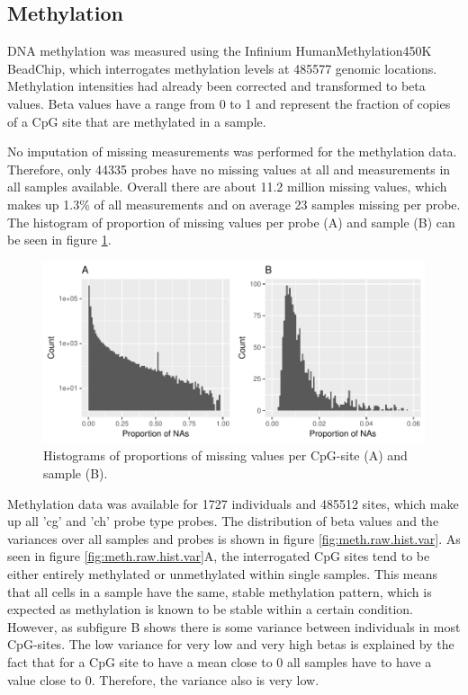 \documentclass[a4paper,12pt,twoside,openright]{report}
\begin{document}
\subsection{Methylation}
\label{Data:Methylation}
DNA methylation was measured using the Infinium HumanMethylation450K BeadChip, which interrogates methylation levels at 485577 genomic locations. Methylation intensities had already been corrected and transformed to beta values. Beta values have a range from 0 to 1 and represent the fraction of copies of a CpG site that are methylated in a sample.

No imputation of missing measurements was performed for the methylation data. Therefore, only 44335 probes have no missing values at all and measurements in all samples available. Overall there are about 11.2 million missing values, which makes up 1.3\% of all measurements and on average 23 samples missing per probe. The histogram of proportion of missing values per probe (A) and sample (B) can be seen in figure \ref{fig:meth.na.hist}.

\begin{figure}[tb]
	\includegraphics[scale = 1, keepaspectratio = true]{../figures/meth_na_hist}  
	\caption{Histograms of proportions of missing values per CpG-site (A) and sample (B).}
    \label{fig:meth.na.hist}
\end{figure}

Methylation data was available for 1727 individuals and 485512 sites, which make up all 'cg' and 'ch' probe type probes. The distribution of beta values and the variances over all samples and probes is shown in figure \ref{fig:meth.raw.hist.var}. As seen in figure \ref{fig:meth.raw.hist.var}A, the interrogated CpG sites tend to be either entirely methylated or unmethylated within single samples. This means that all cells in a sample have the same, stable methylation pattern, which is expected as methylation is known to be stable within a certain condition\cite{}. However, as subfigure B shows there is some variance between individuals in most CpG-sites. The low variance for very low and very high betas is explained by the fact that for a CpG site to have a mean close to 0 all samples have to have a value close to 0. Therefore, the variance also is very low.
\end{document}
